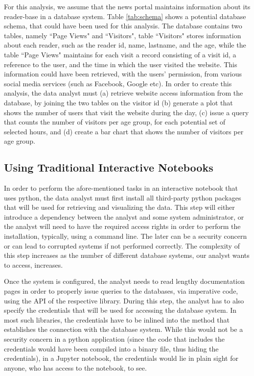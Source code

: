 For this analysis, we assume that the news portal maintains information about its reader-base in a database system. Table \ref{tab:schema} shows a potential database schema, that could have been used for this analysis. The database contains two tables, namely ``Page Views" and ``Visitors", table ``Visitors" stores information about each reader, such as the reader id, name, lastname, and the age, while the table ``Page Views" maintains for each visit a record consisting of a visit id, a reference to the user, and the time in which the user visited the website. This information could have been retrieved, with the users' permission, from various social media services (such as Facebook, Google etc). In order to create this analysis, the data analyst must (a) retrieve  website access information from the database, by joining the two tables on the visitor id (b) generate a plot that shows the number of users that visit the website during the day, (c) issue a query that counts the number of visitors per age group, for each potential set of selected hours, and (d) create a bar chart that shows the number of visitors per age group. 


\subsection{Using Traditional Interactive Notebooks}



In order to perform the afore-mentioned tasks in an interactive notebook that uses python, the data analyst must first install all third-party python packages that will be used for retrieving and visualizing the data. This step will either introduce a dependency between the analyst and some system administrator, or the analyst will need to have the required access rights in order to perform the installation, typically, using a command line. The later can be a security concern or can lead to corrupted systems if not performed correctly. The complexity of this step increases as the number of different database systems, our analyst wants to access, increases. 

Once the system is configured, the analyst needs to read lengthy documentation pages in order to properly issue queries to the databases, via imperative code, using the API of the respective library. During this step, the analyst has to also specify the credentials that will be used for accessing the database system. In most such libraries, the credentials have to be inlined into the method that establishes the connection with the database system. While this would not be a security concern in a python application (since the code that includes the credentials would have been compiled into a binary file, thus hiding the credentials), in a Jupyter notebook, the credentials would lie in plain sight for anyone, who has access to the notebook, to see.

